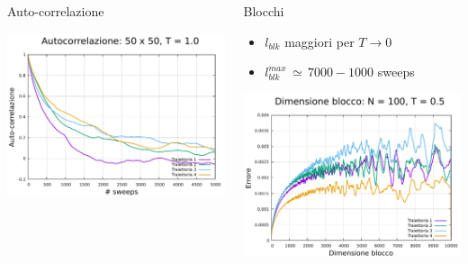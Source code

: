 \begin{frame}
\begin{columns}
\begin{column}{0.33\textwidth}
\begin{block}{Auto-correlazione}
                \vspace{0.5cm}

                \centering
                \includegraphics[width=\textwidth]{Immagini/simXY/auto_50_1.0.pdf}
            
            \end{block}
        \end{column}

        \begin{column}{0.33\textwidth}
            \begin{block}{Blocchi}
                \begin{itemize}[itemsep=0.5em, label=$\diamond$]
                    \item $l_{blk}$ maggiori per $T \to 0$
                    \item $l_{blk}^{max}\,\simeq\,7000-1000$ sweeps
                \end{itemize}

                \vspace{0.5cm}

                \centering
                \includegraphics[width=\textwidth]{Immagini/simXY/lblk_100_0.5.pdf}


\end{block}
\end{column}
\end{columns}
\end{frame}
